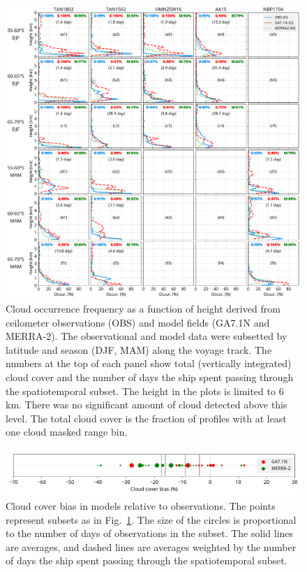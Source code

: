 \begin{figure}[p]
\centering
\centerline{\includegraphics[width=1.12\textwidth]{chapter2/fig/cloud_occurrence_panel_rev1.pdf}}
\caption[Cloud occurrence frequency as a function of height derived from ceilometer
observations and model fields]{
Cloud occurrence frequency as a function of height derived from ceilometer
observations (OBS) and model fields (GA7.1N and MERRA-2). The observational and
model data were subsetted by latitude and season (DJF, MAM) along the voyage
track. The numbers at the top of each panel show total (vertically integrated)
cloud cover and the number of days the ship spent passing through the
spatiotemporal subset. The height in the plots is limited to 6 \unit{km}. There
was no significant amount of cloud detected above this level. The total cloud
cover is the fraction of profiles with at least one cloud masked range bin.
}
\label{fig:2:cloud-occurrence}
\end{figure}

\begin{figure}[t]
\centering
\centerline{\includegraphics[width=1.12\textwidth]{chapter2/fig/cloud_cover_hist_rev1.pdf}}
\caption[Cloud cover bias in models relative to observations]{
Cloud cover bias in models relative to observations. The points represent
subsets as in Fig.~\ref{fig:2:cloud-occurrence}. The size of the circles is
proportional to the number of days of observations in the subset. The solid
lines are averages, and dashed lines are averages weighted by the number of days
the ship spent passing through the spatiotemporal subset.
}
\label{fig:2:cloud-cover-hist}
\end{figure}

